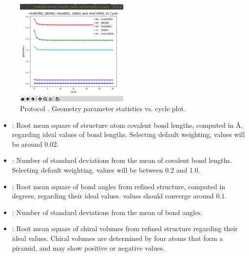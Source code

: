 \begin{itemize}
\begin{itemize}
\begin{figure}[H]
         \includegraphics[width=0.50\textwidth]{Images_appendix/Fig137.pdf}
         \caption{Protocol . Geometry parameter statistics vs. cycle plot.}
         \label{fig:app_protocol_refmac_12}
        \end{figure}
     \begin{itemize}
     \item {}: Root mean square of structure atom covalent bond lengths, computed in \AA, regarding ideal values of bond lengths. Selecting default weighting,  values will be around 0.02.
     
     \item {}: Number of standard deviations from the mean of covalent bond lengths. Selecting default weighting,  values will be between 0.2 and 1.0.
     
     \item {}: Root mean square of bond angles from refined structure, computed in degrees, regarding their ideal values.  values should converge around 0.1.
     
     \item {}: Number of standard deviations from the mean of bond angles. 
     
     \item {}: Root mean square of chiral volumes from refined structure regarding their ideal values. Chiral volumes are determined by four atoms that form a piramid, and may show positive or negative values. 
     \end{itemize}
    \end{itemize}


\end{itemize}
